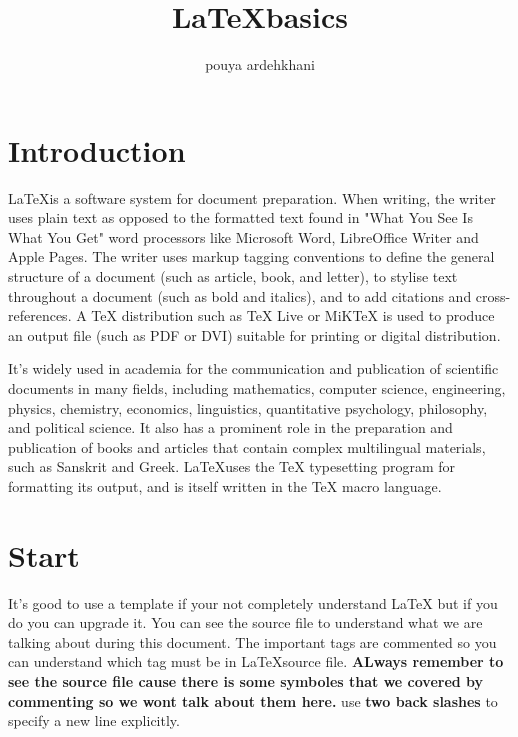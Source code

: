 \documentclass{article} %
\title{\LaTeX \space basics}
\author{pouya ardehkhani}
\date{} %
\begin{document}
\maketitle

\tableofcontents
\pagebreak
\section{Introduction}
    \LaTeX is a software system for document preparation. When writing, the writer uses plain text as opposed to the formatted text found in "What You See Is What You Get" word processors like Microsoft Word, LibreOffice Writer and Apple Pages. The writer uses markup tagging conventions to define the general structure of a document (such as article, book, and letter), to stylise text throughout a document (such as bold and italics), and to add citations and cross-references. A TeX distribution such as TeX Live or MiKTeX is used to produce an output file (such as PDF or DVI) suitable for printing or digital distribution.
    
    It's widely used in academia for the communication and publication of scientific documents in many fields, including mathematics, computer science, engineering, physics, chemistry, economics, linguistics, quantitative psychology, philosophy, and political science. It also has a prominent role in the preparation and publication of books and articles that contain complex multilingual materials, such as Sanskrit and Greek. \LaTeX uses the TeX typesetting program for formatting its output, and is itself written in the TeX macro language.

    
\section{Start}
    It's good to use a template if your not completely understand LaTeX but if you do you can upgrade it. You can see the source file to understand what we are talking about during this document. The important tags are commented so you can understand which tag must be in \LaTeX \space source file. \textbf{ALways remember to see the source file cause there is some symboles that we covered by commenting so we wont talk about them here.} use \textbf{two back slashes} to specify a new line explicitly.
    
\end{document}
